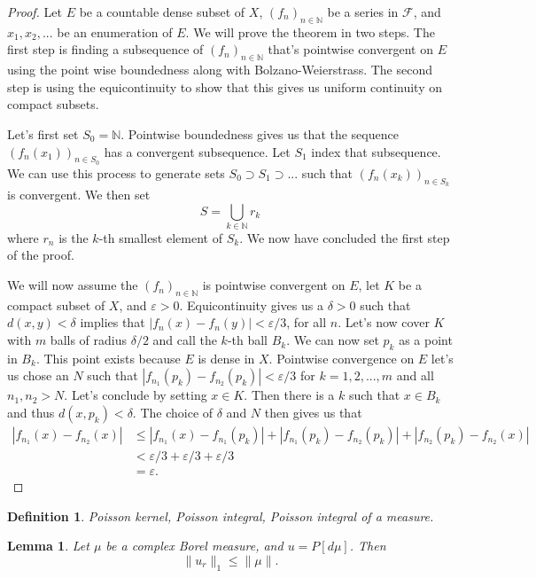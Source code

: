\documentclass[a4paper,12pt,twoside,BCOR=10mm]{scrbook}
\newtheorem{lemma}{Lemma}
\newtheorem{definition}{Definition}
\begin{document}
\begin{proof}
Let $E$ be a countable dense subset of $X$,
	$(f_n)_{n \in \mathbb{N}}$ be a series in $\mathcal{F}$,
	and $x_1, x_2, ...$ be an enumeration of $E$.
We will prove the theorem in two steps.
The first step is finding a subsequence of $(f_n)_{n \in \mathbb{N}}$ that's pointwise convergent on $E$ using the point wise boundedness along with Bolzano-Weierstrass. %
The second step is using the equicontinuity to show that this gives us uniform continuity on compact subsets.

Let's first set $S_0 = \mathbb{N}$.
Pointwise boundedness gives us that the sequence $(f_n(x_1))_{n \in S_0}$ has a convergent subsequence.
Let $S_1$ index that subsequence.
We can use this process to generate sets $S_0 \supset S_1 \supset ...$ such that $(f_n(x_k))_{n \in S_k}$ is convergent.
We then set
\[
	S = \bigcup_{k \in \mathbb{N}} r_k
\]
where $r_n$ is the $k$-th smallest element of $S_k$.
We now have concluded the first step of the proof.

We will now assume the $(f_n)_{n \in \mathbb{N}}$ is pointwise convergent on $E$,
	let $K$ be a compact subset of $X$, and
	$\varepsilon > 0$.
Equicontinuity gives us a $\delta > 0$ such that $d(x, y) < \delta$ implies that $|f_n(x) - f_n(y)| < \varepsilon /3$, for all $n$.
Let's now cover $K$ with $m$ balls of radius $\delta /2$ and call the $k$-th ball $B_k$.
We can now set $p_k$ as a point in $B_k$.
This point exists because $E$ is dense in $X$.
Pointwise convergence on $E$ let's us chose an $N$ such that $|f_{n_1}(p_k) - f_{n_2}(p_k)| < \varepsilon /3$ for $k = 1, 2, ..., m$ and all $n_1, n_2 > N$.
Let's conclude by setting $x \in K$.
Then there is a $k$ such that $x \in B_k$ and thus $d(x, p_k) < \delta$.
The choice of $\delta$ and $N$ then gives us that
\begin{align*}
	|f_{n_1}(x) - f_{n_2}(x)|
	& \leq |f_{n_1}(x) - f_{n_1}(p_k)| + |f_{n_1}(p_k) - f_{n_2}(p_k)| + |f_{n_2}(p_k) - f_{n_2}(x)|\\
	& < \varepsilon /3 + \varepsilon /3 + \varepsilon /3 \\
	& = \varepsilon.
\end{align*}
\end{proof}
\begin{definition}
Poisson kernel, Poisson integral, Poisson integral of a measure.
\end{definition}
\begin{lemma}
\label{FMRlemma1}
Let $\mu$ be a complex Borel measure, and $u = P[d\mu]$.
Then
\[
	\|u_r\|_1 \leq \|\mu\|.
\]
\end{lemma}
\end{document}
